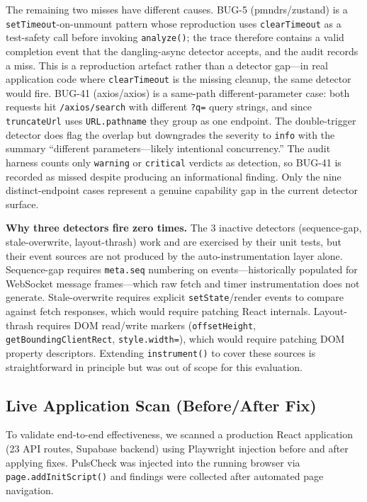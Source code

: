 \documentclass[11pt,a4paper]{article}
\begin{document}
The remaining two misses have different causes. BUG-5 (pmndrs/zustand) is a \texttt{setTimeout}-on-unmount pattern whose reproduction uses \texttt{clearTimeout} as a test-safety call before invoking \texttt{analyze()}; the trace therefore contains a valid completion event that the dangling-async detector accepts, and the audit records a miss. This is a reproduction artefact rather than a detector gap---in real application code where \texttt{clearTimeout} is the missing cleanup, the same detector would fire. BUG-41 (axios/axios) is a same-path different-parameter case: both requests hit \texttt{/axios/search} with different \texttt{?q=} query strings, and since \texttt{truncateUrl} uses \texttt{URL.pathname} they group as one endpoint. The double-trigger detector does flag the overlap but downgrades the severity to \texttt{info} with the summary ``different parameters---likely intentional concurrency.'' The audit harness counts only \texttt{warning} or \texttt{critical} verdicts as detection, so BUG-41 is recorded as missed despite producing an informational finding. Only the nine distinct-endpoint cases represent a genuine capability gap in the current detector surface.

\textbf{Why three detectors fire zero times.} The 3 inactive detectors (sequence-gap, stale-overwrite, layout-thrash) work and are exercised by their unit tests, but their event sources are not produced by the auto-instrumentation layer alone. Sequence-gap requires \texttt{meta.seq} numbering on events---historically populated for WebSocket message frames---which raw fetch and timer instrumentation does not generate. Stale-overwrite requires explicit \texttt{setState}/render events to compare against fetch responses, which would require patching React internals. Layout-thrash requires DOM read/write markers (\texttt{offsetHeight}, \texttt{getBoundingClientRect}, \texttt{style.width=}), which would require patching DOM property descriptors. Extending \texttt{instrument()} to cover these sources is straightforward in principle but was out of scope for this evaluation.

\subsection{Live Application Scan (Before/After Fix)}

To validate end-to-end effectiveness, we scanned a production React application (23 API routes, Supabase backend) using Playwright injection before and after applying fixes. PulsCheck was injected into the running browser via \texttt{page.addInitScript()} and findings were collected after automated page navigation.
\end{document}

